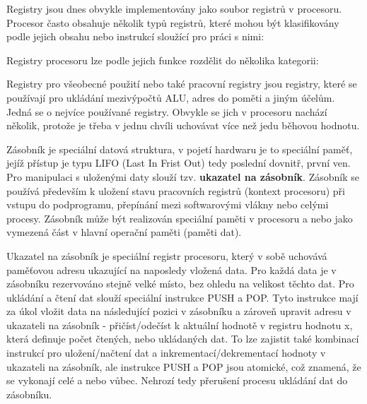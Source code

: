 Registry jsou dnes obvykle implementovány jako soubor registrů v procesoru. Procesor často obsahuje několik typů registrů, které mohou být klasifikovány podle jejich obsahu nebo instrukcí sloužící pro práci s nimi:

\vskip 4mm
\vskip 4mm


Registry procesoru lze podle jejich funkce rozdělit do několika kategorii:

\vskip 4mm
\vskip 4mm


Registry pro všeobecné použití nebo také pracovní registry jsou registry, které se používají pro ukládání mezivýpočtů ALU, adres do poměti a jiným účelům. Jedná se o nejvíce používané registry. Obvykle se jich v procesoru nachází několik, protože je třeba v jednu chvíli uchovávat více než jedu běhovou hodnotu.


Zásobník je speciální datová struktura, v pojetí hardwaru je to speciální paměť, jejíž přístup je typu LIFO (Last In Frist Out) tedy poslední dovnitř, první ven. Pro manipulaci s uloženými daty slouží tzv. {\bf ukazatel na zásobník}. Zásobník se používá především k uložení stavu pracovních registrů (kontext procesoru) při vstupu do podprogramu, přepínání mezi softwarovými vlákny nebo celými procesy. Zásobník může být realizován speciální paměti v procesoru a nebo jako vymezená část v hlavní operační paměti (paměti dat).

Ukazatel na zásobník je speciální registr procesoru, který v sobě uchovává paměťovou adresu ukazující na naposledy vložená data. Pro každá data je v zásobníku rezervováno stejně velké místo, bez ohledu na velikost těchto dat. Pro ukládání a čtení dat slouží speciální instrukce PUSH a POP. Tyto instrukce mají za úkol vložit data na následující pozici v zásobníku a zároveň upravit adresu v ukazateli na zásobník - přičíst/odečíst k aktuální hodnotě v registru hodnotu x, která definuje počet čtených, nebo ukládaných dat. To lze zajistit také kombinací instrukcí pro uložení/načtení dat a inkrementací/dekrementací hodnoty v ukazateli na zásobník, ale instrukce PUSH a POP jsou atomické, což znamená, že se vykonají celé a nebo vůbec. Nehrozí tedy přerušení procesu ukládání dat do zásobníku.

